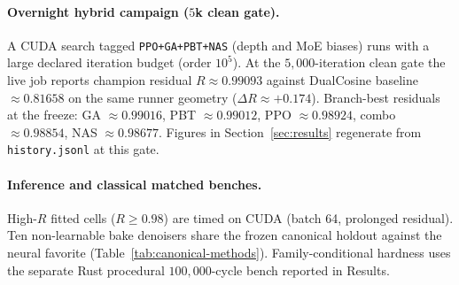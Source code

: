 \paragraph{Overnight hybrid campaign ($5$k clean gate).}
A CUDA search tagged \texttt{PPO+GA+PBT+NAS} (depth and MoE biases) runs with a large declared iteration budget (order $10^{5}$).
At the $5{,}000$-iteration clean gate the live job reports champion residual $R\approx 0.99093$ against DualCosine baseline $\approx 0.81658$ on the same runner geometry ($\Delta R\approx{+}0.174$).
Branch-best residuals at the freeze: GA $\approx 0.99016$, PBT $\approx 0.99012$, PPO $\approx 0.98924$, combo $\approx 0.98854$, NAS $\approx 0.98677$.
Figures in Section~\ref{sec:results} regenerate from \texttt{history.jsonl} at this gate.

\paragraph{Inference and classical matched benches.}
High-$R$ fitted cells ($R\ge 0.98$) are timed on CUDA (batch 64, prolonged residual).
Ten non-learnable bake denoisers share the frozen canonical holdout against the neural favorite (Table~\ref{tab:canonical-methods}).
Family-conditional hardness uses the separate Rust procedural $100{,}000$-cycle bench reported in Results.
